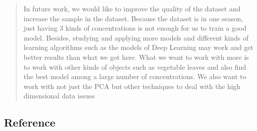 \documentclass[
]{article}
\begin{document}
\begin{quote}
In future work, we would like to improve the quality of the dataset and
increase the sample in the dataset. Because the dataset is in one
season, just having 3 kinds of concentrations is not enough for us to
train a good model. Besides, studying and applying more models and
different kinds of learning algorithms such as the models of Deep
Learning may work and get better results than what we got here. What we
want to work with more is to work with other kinds of objects such as
vegetable leaves and also find the best model among a large number of
concentrations. We also want to work with not just the PCA but other
techniques to deal with the high dimensional data issues
\end{quote}

\hypertarget{reference}{%
\subsection{\texorpdfstring{\textbf{Reference}}{Reference}}\label{reference}}
\end{document}
